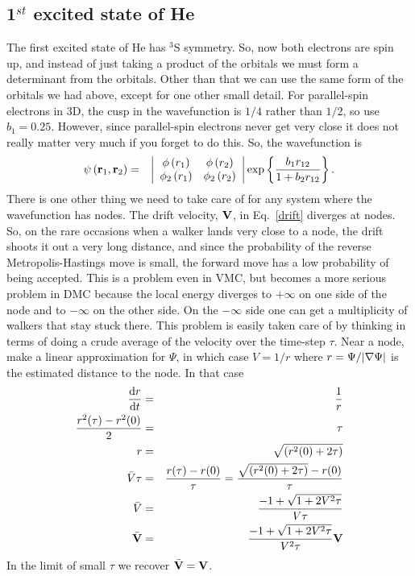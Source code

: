 \documentclass[11pt,aps,prb,amsmath,amssymb,superscriptaddress,notitlepage]{revtex4-1}
\def\beq{\begin{eqnarray}}
\def\eeq{\end{eqnarray}}
\def\rvec{{\bf r}}
\def\Vvec{{\bf V}}
\begin{document}
\subsection{1$^{st}$ excited state of He}
The first excited state of He has $^3$S symmetry.
So, now both electrons are spin up, and instead of just taking a product of the orbitals we
must form a determinant from the orbitals.
Other than that we can use the same form of the orbitals we had above, except for one other small detail.
For parallel-spin electrons in 3D, the cusp in the wavefunction is $1/4$ rather than $1/2$,
so use $b_1=0.25$.  However, since parallel-spin electrons never get very close it does not really
matter very much if you forget to do this.
So, the wavefunction is
\beq
\psi\left(\rvec_{1},\rvec_{2}\right) &=& \left|\begin{array}{cc}
\phi\left(r_1\right) & \phi\left(r_{2}\right)\\
\phi_{2}\left(r_1\right) & \phi_{2}\left(r_{2}\right)
\end{array}\right|
\exp\left\{ \frac{b_1 r_{12}}{1+b_2 r_{12}}\right\}.
\label{Slater_Jastrow}
\eeq
There is one other thing we need to take care of for any system where the wavefunction has nodes.
The drift velocity, $\Vvec$, in Eq.~\ref{drift} diverges at nodes.  So, on the rare occasions when
a walker lands very close to a node, the drift shoots it out a very long distance, and since the
probability of the reverse Metropolis-Hastings move is small, the forward move has a low probability
of being accepted.  This is a problem even in VMC, but becomes a more serious problem in DMC
because the local energy diverges to $+\infty$ on one side of the node and to $-\infty$ on the
other side.  On the $-\infty$ side one can get a multiplicity of walkers that stay stuck there.
This problem is easily taken care of by thinking in terms of doing a crude average of the
velocity over the time-step $\tau$.
Near a node, make a linear approximation for $\Psi$, in which case $V=1/r$ where
$r = \Psi / |{\bf\nabla} \Psi|$ is the estimated distance to the node.
In that case
\beq
{\diff r \over \diff t} &=& {1 \over r} \nonumber \\
{r^2(\tau)-r^2(0) \over 2} &=& \tau \nonumber \\
r &=& \sqrt{(r^2(0)+2\tau)} \nonumber \\
\label{Vbar_tau}
\bar{V} \tau &=& {r(\tau)-r(0) \over \tau}  = {\sqrt{(r^2(0)+2\tau)} - r(0) \over \tau} \nonumber \\
\bar{V} &=& {-1 + \sqrt{1+2V^2\tau} \over V \tau} \nonumber \\
\bar{\Vvec} &=& {-1 + \sqrt{1+2V^2\tau} \over V^2 \tau} \Vvec
\label{Vbar}
\eeq
In the limit of small $\tau$ we recover $\bar{\Vvec} = \Vvec$.
\end{document}
